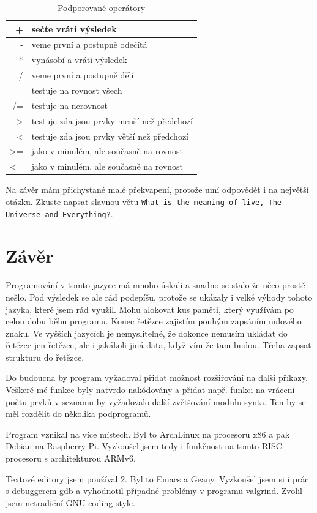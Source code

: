 \documentclass[a4paper, 12pt]{article}
\begin{document}
\begin{table}
\centering
\begin{tabular}{|r|l|}
\hline
+ & sečte vrátí výsledek\\ \hline
- & veme první a postupně odečítá\\ \hline
* & vynásobí a vrátí výsledek\\ \hline
/ & veme první a postupně dělí\\ \hline
= & testuje na rovnost všech\\ \hline
/= & testuje na nerovnost\\ \hline
\textgreater{} & testuje zda jsou prvky menší než předchozí\\ \hline
\textless{} & testuje zda jsou prvky větší než předchozí\\ \hline
\textgreater{=} & jako v minulém, ale současně na rovnost\\ \hline
\textless{=} & jako v minulém, ale současně na rovnost\\ \hline
\end{tabular}
\caption{Podporované operátory}
\label{tab:op}
\end{table}

Na závěr mám přichystané malé překvapení, protože umí odpovědět i
na největší otázku. Zkuste napsat slavnou větu \texttt{What is the
meaning of live, The Universe and Everything?}.

\section{Závěr}
Programování v tomto jazyce má mnoho úskalí a snadno se stalo že něco
prostě nešlo. Pod výsledek se ale rád podepíšu, protože se ukázaly i velké
výhody tohoto jazyka, které jsem rád využil. Mohu alokovat kus paměti,
který využívám po celou dobu běhu programu. Konec řetězce zajistím pouhým
zapsáním nulového znaku. Ve vyšších jazycích je nemyslitelné, že dokonce
nemusím ukládat do řetězce jen řetězce, ale i jakákoli jiná data, když vím
že tam budou. Třeba zapsat strukturu do řetězce.

Do budoucna by program vyžadoval přidat možnost rozšiřování na další
příkazy. Veškeré mé funkce byly natvrdo nakódovány a přidat např.
funkci na vrácení počtu prvků v seznamu by vyžadovalo další zvětšování
modulu \textsf{synta}. Ten by se měl rozdělit do několika podprogramů.

Program vznikal na více místech. Byl to ArchLinux na procesoru x86 a
pak Debian na Raspberry Pi. Vyzkoušel jsem tedy i funkčnost na tomto
RISC procesoru s architekturou ARMv6.

Textové editory jsem používal 2. Byl to Emacs a Geany. Vyzkoušel jsem si i
práci s debuggerem \textsf{gdb} a vyhodnotil případné problémy v
programu \textsf{valgrind}. Zvolil jsem netradiční GNU coding style.

\nocite{wiki:cpro}
\nocite{pred:c}

\listoftables
\end{document}
